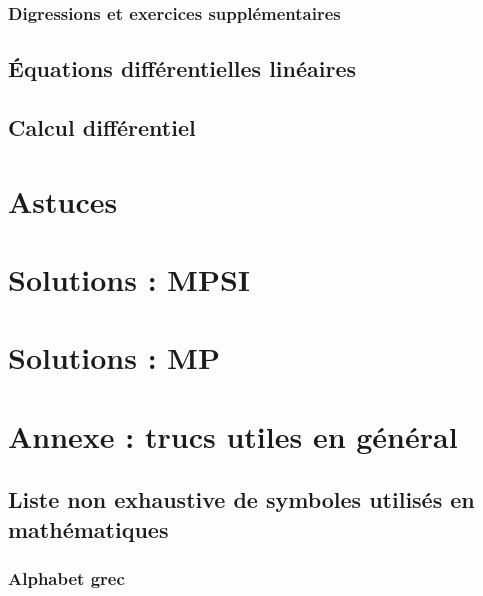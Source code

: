 \documentclass[12pt,a4paper]{exo_book}
\begin{document}
\section{Digressions et exercices supplémentaires}

\chapter{Équations différentielles linéaires}

\chapter{Calcul différentiel}




\part{Astuces}


\part{Solutions : MPSI}


\part{Solutions : MP}

\appendix

\part{Annexe : trucs utiles en général}


\chapter{Liste non exhaustive de symboles utilisés en mathématiques}

\section{Alphabet grec}
\end{document}
